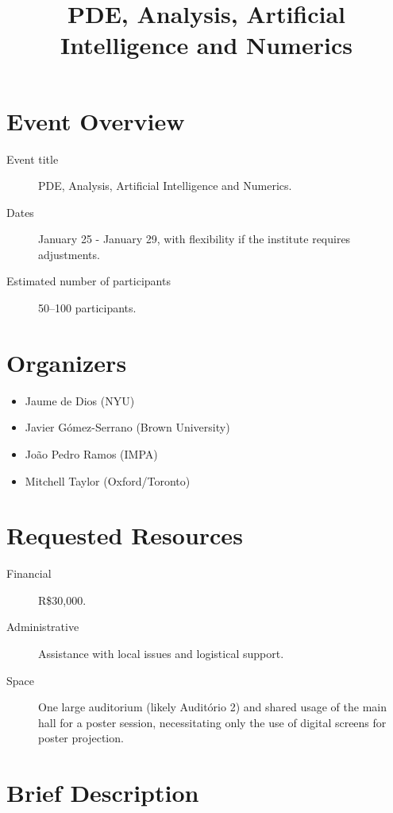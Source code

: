 \documentclass[a4paper]{amsart}
\title[PA\textsuperscript{2}IN]{PDE, Analysis, Artificial Intelligence and Numerics}
\begin{document}
\maketitle

\section*{Event Overview}

\begin{description}
  \item[Event title] PDE, Analysis, Artificial Intelligence and Numerics.
  \item[Dates] January 25 - January 29, with flexibility if the institute requires adjustments.
  \item[Estimated number of participants] 50--100 participants.
\end{description}

\section*{Organizers}

\begin{itemize}
  \item Jaume de Dios (NYU)
  \item Javier G\'omez-Serrano (Brown University)
  \item Jo\~ao Pedro Ramos (IMPA)
  \item Mitchell Taylor (Oxford/Toronto)
\end{itemize}

\section*{Requested Resources}

\begin{description}
  \item[Financial] R\$30,000.
  \item[Administrative] Assistance with local issues and logistical support.
  \item[Space] One large auditorium (likely Audit\'orio 2) and shared usage of the main hall for a poster session, necessitating only the use of digital screens for poster projection.
\end{description}

\section*{Brief Description}
\end{document}

